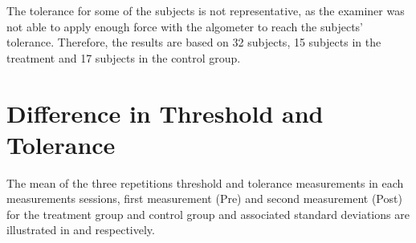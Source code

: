 The tolerance for some of the subjects is not representative, as the examiner was not able to apply enough force with the algometer to reach the subjects' tolerance. Therefore, the results are based on 32 subjects, 15 subjects in the treatment and 17 subjects in the control group.

\section{Difference in Threshold and Tolerance}
The mean of the three repetitions threshold and tolerance measurements in each measurements sessions, first measurement (Pre) and second measurement (Post) for the treatment group and control group and associated standard deviations are illustrated in   and  respectively. 

